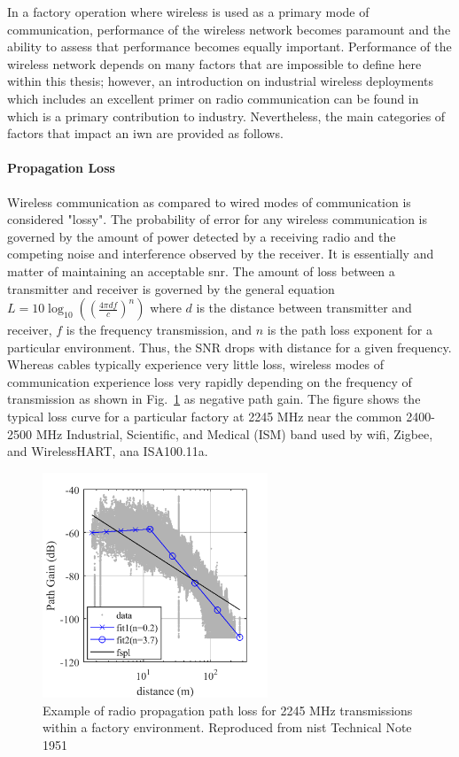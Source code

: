In a factory operation where wireless is used as a primary mode of communication, performance of the wireless network becomes paramount and the ability to assess that performance becomes equally important.  Performance of the wireless network depends on many factors that are impossible to define here within this thesis; however, an introduction on industrial wireless deployments which includes an excellent primer on radio communication can be found in~\cite{Candell2018.IWSGuide} which is a primary contribution to industry.  Nevertheless, the main categories of factors that impact an \gls{iwn} are provided as follows.

\paragraph{Propagation Loss} Wireless communication as compared to wired modes of communication is considered "lossy".  The probability of error for any wireless communication is governed by the amount of power detected by a receiving radio and the competing noise and interference observed by the receiver.  It is essentially and matter of maintaining an acceptable \gls{snr}. The amount of loss between a transmitter and receiver is governed by the general equation $L=10\log_{10}\left(\left(\frac{4\pi d f}{c}\right)^n\right)$ where $d$ is the distance between transmitter and receiver, $f$ is the frequency transmission, and $n$ is the path loss exponent for a particular environment.  Thus, the SNR drops with distance for a given frequency.  Whereas cables typically experience very little loss, wireless modes of communication experience loss very rapidly depending on the frequency of transmission as shown in Fig.~\ref{intro:pathloss-example} as negative path gain.  The figure shows the typical loss curve for a particular factory at 2245 MHz near the common 2400-2500 MHz Industrial, Scientific, and Medical (ISM) band used by \gls{wifi}, Zigbee, and WirelessHART, ana ISA100.11a.

\begin{figure}
	\centering
	\includegraphics[width=0.6\textwidth]{chapter-intro/images/gain2245}
	\caption{Example of radio propagation path loss for 2245 MHz transmissions within a factory environment.  Reproduced from \gls{nist} Technical Note 1951~\cite{Candell2017.NIST1951}}
	\label{intro:pathloss-example}
\end{figure}
 
